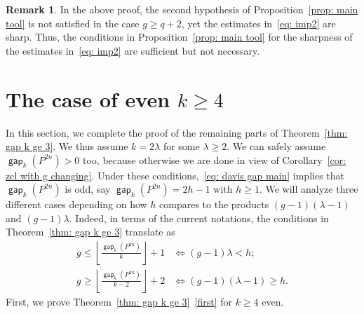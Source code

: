 \documentclass[amscd,amssymb,verbatim,10pt]{amsart}
\numberwithin{equation}{section}
\theoremstyle{plain}
\theoremstyle{definition}
\newtheorem{remark}[thm]{Remark}
\DeclareMathOperator{\gap}{{\mathsf{gap}}}
\begin{document}
\begin{remark}
    In the above proof, the second hypothesis of Proposition~\ref{prop: main tool} is not satisfied in the case $g\ge q+2$, yet the estimates in~\eqref{eq: imp2} are sharp. Thus, the conditions in Proposition~\ref{prop: main tool} for the sharpness of the estimates in~\eqref{eq: imp2} are sufficient but not necessary.
\end{remark}

\section{The case of even $k\ge 4$}\label{sec: k even}

In this section, we complete the proof of the remaining parts of Theorem~\ref{thm: gap k ge 3}. We thus assume $k=2\lambda$ for some $\lambda\ge 2$. We can safely assume $\gap_k(P^{2n})>0$ too, because otherwise we are done in view of Corollary~\ref{cor: zcl with g changing}. Under these conditions,~\eqref{eq: davis gap main} implies that $\gap_k(P^{2n})$ is odd, say $\gap_k(P^{2n})=2h-1$ with $h\geq1$. We will analyze three different cases depending on how $h$ compares to the products $(g-1)(\lambda-1)$ and $(g-1)\lambda$. Indeed, in terms of the current notations, the conditions in Theorem~\ref{thm: gap k ge 3} translate as
\begin{align*}
g\le\left\lfloor\frac{\gap_k(P^{2n})}{k}\right\rfloor+1&\iff(g-1)\lambda<h; \\  g\ge\left\lfloor\frac{\gap_k(P^{2n})}{k-2}\right\rfloor+2&\iff(g-1)(\lambda-1)\ge h.
\end{align*} 
First, we prove Theorem~\ref{thm: gap k ge 3}~\eqref{first} for $k\ge 4$ even. 
\end{document}
